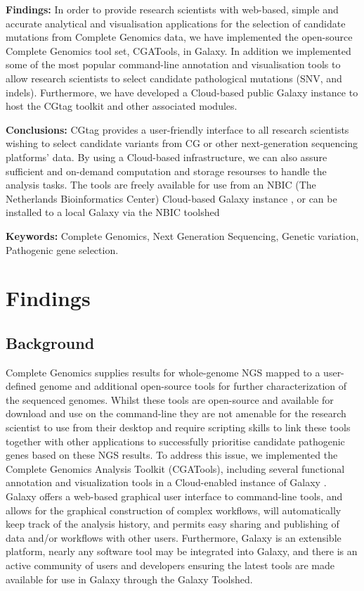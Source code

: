 \textbf{Findings:} In order to provide research scientists with web-based, simple and accurate analytical and visualisation applications for the selection of candidate mutations from Complete Genomics data, we have implemented the open-source Complete Genomics tool set, CGATools, in Galaxy.  In addition we implemented some of the most popular command-line annotation and visualisation tools to allow research scientists to select candidate pathological mutations (SNV, and indels).  Furthermore, we have developed a Cloud-based public Galaxy instance to host the CGtag toolkit and other associated modules.

\textbf{Conclusions:} CGtag provides a user-friendly interface to all research scientists wishing to select candidate variants from CG or other next-generation sequencing platforms’ data. By using a Cloud-based infrastructure, we can also assure sufficient and on-demand computation and storage resourses to handle the analysis tasks. The tools are freely available for use from an NBIC (The Netherlands Bioinformatics Center) Cloud-based Galaxy instance \cite{url-nbicgalaxy}, or can be installed to a local Galaxy via the NBIC toolshed \cite{url-nbictoolshed}

\textbf{Keywords:} Complete Genomics, Next Generation Sequencing, Genetic variation, Pathogenic gene selection.



\section*{Findings }

\subsection*{Background}

Complete Genomics supplies results for whole-genome NGS mapped to a user-defined genome \cite{ma} and additional open-source tools \cite{url-cgatools} for further characterization of the sequenced genomes.  Whilst these tools are open-source and available for download and use on the command-line they are not amenable for the research scientist to use from their desktop and require scripting skills to link these tools together with other applications to successfully prioritise candidate pathogenic genes based on these NGS results.  To address this issue, we implemented the Complete Genomics Analysis Toolkit (CGATools), including several functional annotation and visualization tools in a Cloud-enabled instance of Galaxy \cite{drmanac}.  Galaxy offers a web-based graphical user interface to command-line tools, and allows for the graphical construction of complex workflows, will automatically keep track of the analysis history, and permits easy sharing and publishing of data and/or workflows with other users. Furthermore, Galaxy is an extensible platform, nearly any software tool may be integrated into Galaxy, and there is an active community of users and developers ensuring the latest tools are made available for use in Galaxy through the Galaxy Toolshed.


